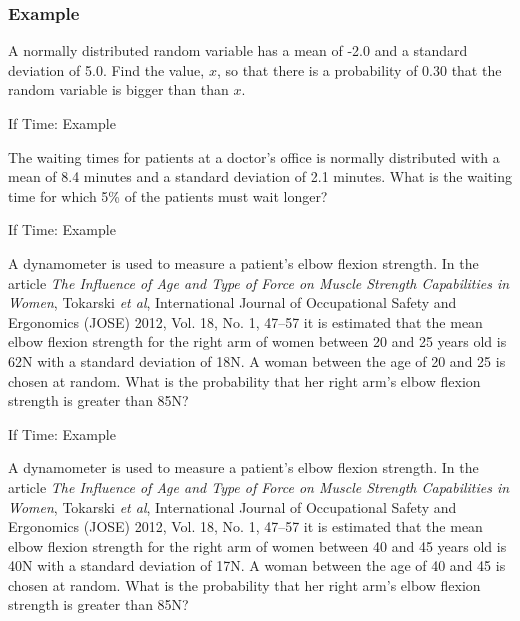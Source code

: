 \begin{frame}
  \frametitle{Example}

  A normally distributed random variable has a mean of -2.0 and a
  standard deviation of 5.0. Find the value, $x$, so that there is a
  probability of 0.30 that the random variable is bigger than than
  $x$.

  \vfill

\end{frame}


\begin{frame}{If Time: Example}

  The waiting times for patients at a doctor's office is normally
  distributed with a mean of 8.4 minutes and a standard deviation of
  2.1 minutes. What is the waiting time for which 5\% of the patients
  must wait longer?
  
  \vfill

\end{frame}


\begin{frame}{If Time: Example}

  A dynamometer is used to measure a patient's elbow flexion
  strength. In the article \textit{The Influence of Age and Type of
    Force on Muscle Strength Capabilities in Women}, Tokarski
  \textit{et al}, International Journal of Occupational Safety and
  Ergonomics (JOSE) 2012, Vol. 18, No. 1, 47–57 it is estimated that
  the mean elbow flexion strength for the right arm of women between
  20 and 25 years old is 62N with a standard deviation of 18N. A
  woman between the age of 20 and 25 is chosen at random. What is the
  probability that her right arm's elbow flexion strength is greater
  than 85N?

  
  \vfill

\end{frame}


\begin{frame}{If Time: Example}

  A dynamometer is used to measure a patient's elbow flexion
  strength. In the article \textit{The Influence of Age and Type of
    Force on Muscle Strength Capabilities in Women}, Tokarski
  \textit{et al}, International Journal of Occupational Safety and
  Ergonomics (JOSE) 2012, Vol. 18, No. 1, 47–57 it is estimated that
  the mean elbow flexion strength for the right arm of women between
  40 and 45 years old is 40N with a standard deviation of 17N. A
  woman between the age of 40 and 45 is chosen at random. What is the
  probability that her right arm's elbow flexion strength is greater
  than 85N?

  
  \vfill

\end{frame}



